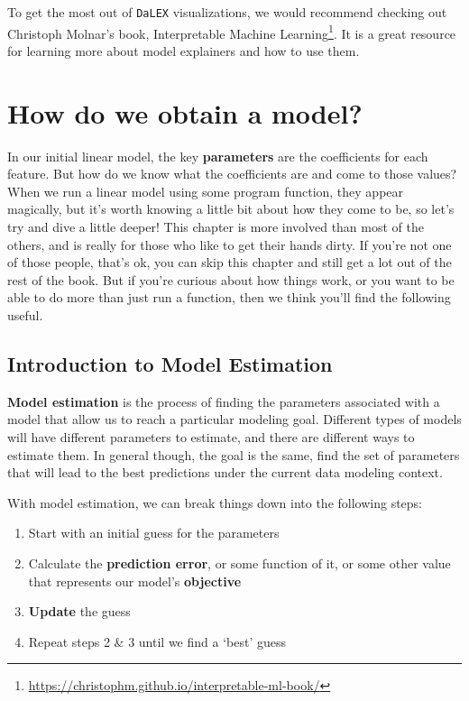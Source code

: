 \documentclass[
  letterpaper,
]{krantz}
\providecommand{\tightlist}{%
  \setlength{\itemsep}{0pt}\setlength{\parskip}{0pt}}\usepackage{longtable,booktabs,array}
\DeclareRobustCommand{\href}[2]{#2\footnote{\url{#1}}}
\begin{document}
To get the most out of \texttt{DaLEX} visualizations, we would recommend
checking out Christoph Molnar's book,
\href{https://christophm.github.io/interpretable-ml-book/}{Interpretable
Machine Learning}. It is a great resource for learning more about model
explainers and how to use them.

\chapter{How do we obtain a model?}\label{how-do-we-obtain-a-model}

In our initial linear model, the key \textbf{parameters} are the
coefficients for each feature. But how do we know what the coefficients
are and come to those values? When we run a linear model using some
program function, they appear magically, but it's worth knowing a little
bit about how they come to be, so let's try and dive a little deeper!
This chapter is more involved than most of the others, and is really for
those who like to get their hands dirty. If you're not one of those
people, that's ok, you can skip this chapter and still get a lot out of
the rest of the book. But if you're curious about how things work, or
you want to be able to do more than just run a function, then we think
you'll find the following useful.

\section{Introduction to Model
Estimation}\label{introduction-to-model-estimation}

\textbf{Model estimation} is the process of finding the parameters
associated with a model that allow us to reach a particular modeling
goal. Different types of models will have different parameters to
estimate, and there are different ways to estimate them. In general
though, the goal is the same, find the set of parameters that will lead
to the best predictions under the current data modeling context.

With model estimation, we can break things down into the following
steps:

\begin{enumerate}
\def\labelenumi{\arabic{enumi}.}
\tightlist
\item
  Start with an initial guess for the parameters
\item
  Calculate the \textbf{prediction error}, or some function of it, or
  some other value that represents our model's \textbf{objective}
\item
  \textbf{Update} the guess
\item
  Repeat steps 2 \& 3 until we find a `best' guess
\end{enumerate}
\end{document}
